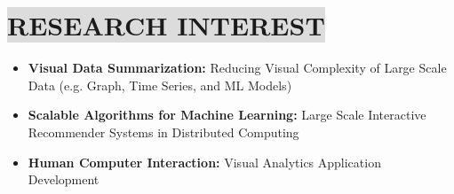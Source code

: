 \section*{
    \colorbox{gainsboro}{RESEARCH INTEREST}
}

\begin{itemize}[noitemsep,itemsep=0pt,topsep=0pt,leftmargin=0mm]
    \item[]\textbf{Visual Data Summarization:} Reducing Visual Complexity of Large Scale Data (e.g. Graph, Time Series, and ML Models)
    \item[]\textbf{Scalable Algorithms for Machine Learning:} Large Scale Interactive Recommender Systems in Distributed Computing
    \item[]\textbf{Human Computer Interaction:}  Visual Analytics Application Development
\end{itemize}